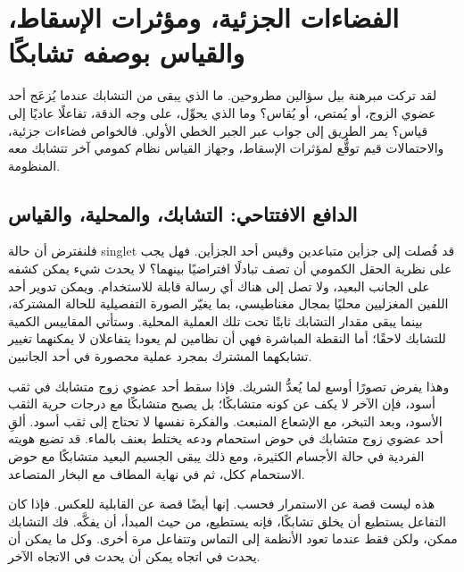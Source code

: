 \chapter{الفضاءات الجزئية، ومؤثرات الإسقاط، والقياس بوصفه تشابكًا}

لقد تركت مبرهنة بيل سؤالين مطروحين. ما الذي يبقى من التشابك عندما يُزعَج أحد عضوي الزوج، أو يُمتص، أو يُقاس؟ وما الذي يحوِّل، على وجه الدقة، تفاعلًا عاديًا إلى قياس؟ يمر الطريق إلى جواب عبر الجبر الخطي الأولي. فالخواص فضاءات جزئية، والاحتمالات قيم توقُّع لمؤثرات الإسقاط، وجهاز القياس نظام كمومي آخر تتشابك معه المنظومة.

\section{الدافع الافتتاحي: التشابك، والمحلية، والقياس}

فلنفترض أن حالة singlet قد فُصلت إلى جزأين متباعدين وقيس أحد الجزأين. فهل يجب على نظرية الحقل الكمومي أن تصف تبادلًا افتراضيًا بينهما؟ لا يحدث شيء يمكن كشفه على الجانب البعيد، ولا تصل إلى هناك أي رسالة قابلة للاستخدام. ويمكن تدوير أحد اللفين المغزليين محليًا بمجال مغناطيسي، بما يغيّر الصورة التفصيلية للحالة المشتركة، بينما يبقى مقدار التشابك ثابتًا تحت تلك العملية المحلية. وستأتي المقاييس الكمية للتشابك لاحقًا؛ أما النقطة المباشرة فهي أن نظامين لم يعودا يتفاعلان لا يمكنهما تغيير تشابكهما المشترك بمجرد عملية محصورة في أحد الجانبين.

\begin{classroomqa}
\end{classroomqa}

وهذا يفرض تصورًا أوسع لما يُعدُّ الشريك. فإذا سقط أحد عضوي زوج متشابك في ثقب أسود، فإن الآخر لا يكف عن كونه متشابكًا؛ بل يصبح متشابكًا مع درجات حرية الثقب الأسود، وبعد التبخر، مع الإشعاع المنبعث. والفكرة نفسها لا تحتاج إلى ثقب أسود. ألقِ أحد عضوي زوج متشابك في حوض استحمام ودعه يختلط بعنف بالماء. قد تضيع هويته الفردية في حالة الأجسام الكثيرة، ومع ذلك يبقى الجسيم البعيد متشابكًا مع حوض الاستحمام ككل، ثم في نهاية المطاف مع البخار المتصاعد.

هذه ليست قصة عن الاستمرار فحسب. إنها أيضًا قصة عن القابلية للعكس. فإذا كان التفاعل يستطيع أن يخلق تشابكًا، فإنه يستطيع، من حيث المبدأ، أن يفكَّه. فك التشابك ممكن، ولكن فقط عندما تعود الأنظمة إلى التماس وتتفاعل مرة أخرى. وكل ما يمكن أن يحدث في اتجاه يمكن أن يحدث في الاتجاه الآخر.

